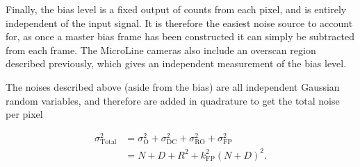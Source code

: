 \begin{colsection}
\begin{colsection}
Finally, the bias level is a fixed output of counts from each pixel, and is entirely independent of the input signal. It is therefore the easiest noise source to account for, as once a master bias frame has been constructed it can simply be subtracted from each frame. The MicroLine cameras also include an overscan region described previously, which gives an independent measurement of the bias level.

The noises described above (aside from the bias) are all independent Gaussian random variables, and therefore are added in quadrature to get the total noise per pixel

\begin{equation}
    \begin{split}
        \sigma_\text{Total}^2 & = \sigma_\text{O}^2 +
                                  \sigma_\text{DC}^2 +
                                  \sigma_\text{RO}^2 +
                                  \sigma_\text{FP}^2 \\
                              & = N + D + R^2 + k_\text{FP}^2{(N+D)}^2.
    \end{split}
    \label{eq:noise}
\end{equation}

\end{colsection}


\end{colsection}


\newpage
